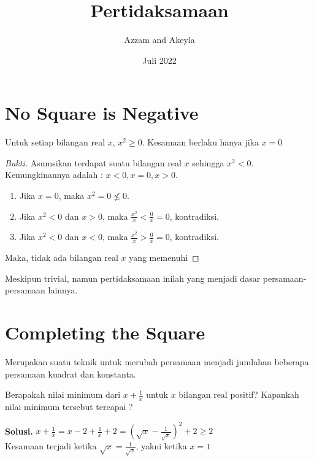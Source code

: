 \documentclass[11pt]{scrartcl}
\title{Pertidaksamaan}
\author{Azzam and Akeyla}
\date{Juli 2022}
\begin{document}
\maketitle

\renewcommand*\contentsname{Daftar Isi}
\tableofcontents

\newpage
\section{No Square is Negative}
\begin{theorem}
  Untuk setiap bilangan real $x$, $x^2 \geq 0$. Kesamaan berlaku hanya jika $x = 0$
\end{theorem}
\begin{proof}[Bukti]
Asumsikan terdapat suatu bilangan real $x$ sehingga $x^2 < 0$. Kemungkinannya adalah : $x < 0, x = 0, x > 0$.
\begin{enumerate}
    \item Jika $x = 0$, maka $x^2 = 0 \not\leq 0$.
    \item Jika $x^2 < 0 $ dan $x > 0$, maka $\frac{x^2}{x} < \frac{0}{x} = 0$, kontradiksi.
    \item Jika $x^2 < 0$ dan $x < 0$, maka $\frac{x^2}{x} > \frac{0}{x} = 0$, kontradiksi.
\end{enumerate}
Maka, tidak ada bilangan real $x$ yang memenuhi
\end{proof}
Meskipun trivial, namun pertidaksamaan inilah yang menjadi dasar persamaan- persamaan lainnya. 
\section{Completing the Square}
Merupakan suatu teknik untuk merubah persamaan menjadi jumlahan beberapa persamaan kuadrat dan konstanta.
\begin{example}
Berapakah nilai minimum dari $x + \frac{1}{x}$ untuk $x$ bilangan real positif? Kapankah nilai minimum tersebut tercapai ?
\end{example}
\textbf{Solusi.} $x + \frac{1}{x} = x - 2 + \frac{1}{x} + 2 = (\sqrt{x} - \frac{1}{\sqrt{x}})^2 + 2 \geq 2$\\Kesamaan terjadi ketika $\sqrt{x} = \frac{1}{\sqrt{x}}$, yakni ketika $x = 1$\\
\end{document}
